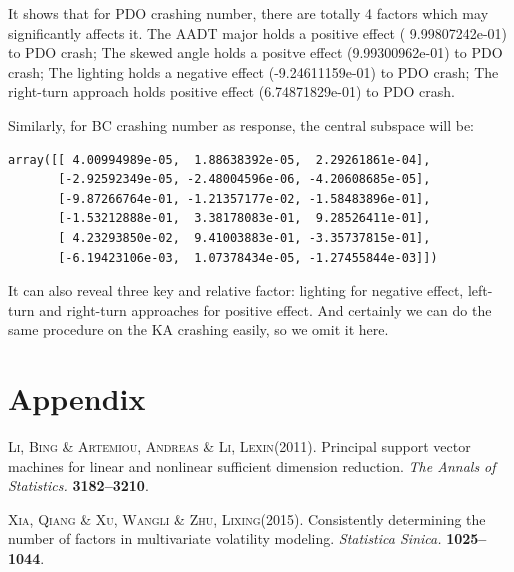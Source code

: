 \documentclass[11pt]{scrartcl} %
\begin{document}
\par

It shows that for PDO crashing number, there are totally 4 factors which may significantly affects it. The AADT major holds a positive effect ( 9.99807242e-01) to PDO crash; The skewed angle holds a positve effect (9.99300962e-01) to PDO crash; The lighting holds a negative effect (-9.24611159e-01) to PDO crash; The right-turn approach holds positive effect (6.74871829e-01) to PDO crash.

\par

Similarly, for BC crashing number as response, the central subspace will be:

\begin{lstlisting}
array([[ 4.00994989e-05,  1.88638392e-05,  2.29261861e-04],
       [-2.92592349e-05, -2.48004596e-06, -4.20608685e-05],
       [-9.87266764e-01, -1.21357177e-02, -1.58483896e-01],
       [-1.53212888e-01,  3.38178083e-01,  9.28526411e-01],
       [ 4.23293850e-02,  9.41003883e-01, -3.35737815e-01],
       [-6.19423106e-03,  1.07378434e-05, -1.27455844e-03]])
\end{lstlisting}

It can also reveal three key and relative factor: lighting for negative effect, left-turn and right-turn approaches for positive effect. And certainly we can do the same procedure on the KA crashing easily, so we omit it here.

\section{Appendix}



\begin{thebibliography}{}

\textsc{Li, Bing} \& \textsc{Artemiou, Andreas} \& \textsc{Li, Lexin}(2011).
\newblock Principal support vector machines for linear and nonlinear sufficient dimension reduction.
\newblock \textit{The Annals of Statistics.}
\textbf{3182--3210}.

\textsc{Xia, Qiang} \& \textsc{Xu, Wangli} \& \textsc{Zhu, Lixing}(2015).
\newblock Consistently determining the number of factors in multivariate volatility modeling.
\newblock \textit{Statistica Sinica.}
\textbf{1025--1044}.


\end{thebibliography}


\end{document}
